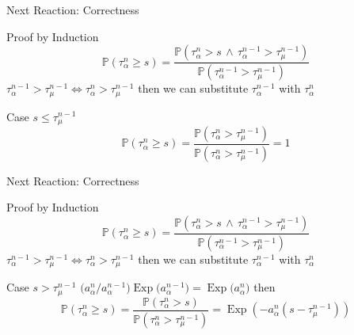 \documentclass{beamer}
\DeclareMathOperator{\Exp}{\text{Exp}}
\begin{document}
\begin{frame}{Next Reaction: Correctness}
  \begin{block}{Proof by Induction}
    \begin{equation*}
      \mathbb{P}\left(\tau^n_\alpha \geq s\right) =
      \frac{\mathbb{P}\left(\tau^n_\alpha > s \, \land \, \tau^{n-1}_\alpha > \tau^{n-1}_\mu \right)}{
        \mathbb{P}\left(\tau^{n-1}_\alpha > \tau^{n-1}_\mu \right)}
    \end{equation*}
    $\tau^{n-1}_\alpha > \tau^{n-1}_\mu \iff \tau^n_\alpha > \tau^{n-1}_\mu$ then we can
    substitute $\tau_\alpha^{n-1}$ with $\tau_\alpha^{n}$
    \begin{center}
      \begin{minipage}{.8 \textwidth}
        \begin{block}{Case $s \leq \tau_\mu^{n-1}$}
          \begin{equation*}
            \mathbb{P}\left(\tau^n_\alpha \geq s\right) =
            \frac{\mathbb{P}\left(\tau^{n}_\alpha > \tau^{n-1}_\mu \right)}
            {\mathbb{P}\left(\tau^{n}_\alpha > \tau^{n-1}_\mu \right)} = 1
         \end{equation*}
        \end{block}
      \end{minipage}
    \end{center} 
  \end{block}
\end{frame}

\begin{frame}{Next Reaction: Correctness}
  \begin{block}{Proof by Induction}
    \begin{equation*}
      \mathbb{P}\left(\tau^n_\alpha \geq s\right) =
      \frac{\mathbb{P}\left(\tau^n_\alpha > s \, \land \, \tau^{n-1}_\alpha > \tau^{n-1}_\mu \right)}{
        \mathbb{P}\left(\tau^{n-1}_\alpha > \tau^{n-1}_\mu \right)}
    \end{equation*}
    $\tau^{n-1}_\alpha > \tau^{n-1}_\mu \iff \tau^n_\alpha > \tau^{n-1}_\mu$ then we can
    substitute $\tau_\alpha^{n-1}$ with $\tau_\alpha^{n}$
    \begin{center}
      \begin{minipage}{.8 \textwidth}
        \begin{block}{Case $s > \tau_\mu^{n-1}$}
          $\bigl(a_\alpha^n \big/ a_\alpha^{n-1}\bigl) \Exp\bigl(a_\alpha^{n-1}\bigr) =
          \Exp\bigl(a_\alpha^{n}\bigr)$ then
          \begin{equation*}
            \mathbb{P}\left(\tau^n_\alpha \geq s\right) =
            \frac{\mathbb{P}\left(\tau^{n}_\alpha > s \right)}
            {\mathbb{P}\left(\tau^{n}_\alpha > \tau^{n-1}_\mu \right)} =
            \Exp\left(-a_\alpha^n \left(s - \tau_\mu^{n-1}\right)\right)
         \end{equation*}
        \end{block}
      \end{minipage}
    \end{center} 
  \end{block}
\end{frame}
\end{document}
